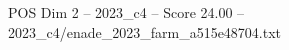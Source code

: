 \begin{textsample}{POS Dim 2 – 2023\_c4 – Score 24.00 – 2023\_c4/enade\_2023\_farm\_a515e48704.txt}
\end{textsample}
